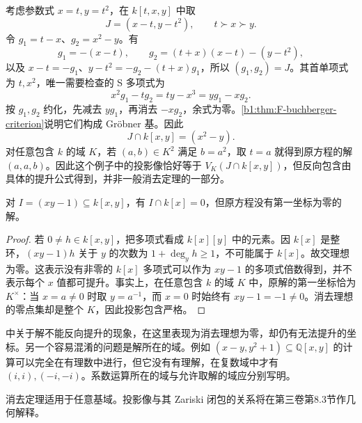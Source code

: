 \begin{example}[参数的消去]\label{b1:exm:F-parameter-elimination}
	考虑参数式 \(x=t,y=t^2\)，在 \(k[t,x,y]\) 中取
	\[
		J=(x-t,y-t^2),\qquad t\succ x\succ y.
	\]
	令 \(g_1=t-x\)、\(g_2=x^2-y\)。有
	\[
		g_1=-(x-t),\qquad g_2=(t+x)(x-t)-(y-t^2),
	\]
	以及 \(x-t=-g_1\)、\(y-t^2=-g_2-(t+x)g_1\)，所以 \((g_1,g_2)=J\)。其首单项式为 \(t,x^2\)，唯一需要检查的 S 多项式为
	\[
		x^2g_1-tg_2=ty-x^3=yg_1-xg_2.
	\]
	按 \(g_1,g_2\) 约化，先减去 \(yg_1\)，再消去 \(-xg_2\)，余式为零。\cref{b1:thm:F-buchberger-criterion}说明它们构成 Gröbner 基。因此
	\[
		J\cap k[x,y]=(x^2-y).
	\]
	对任意包含 \(k\) 的域 \(K\)，若 \((a,b)\in K^2\) 满足 \(b=a^2\)，取 \(t=a\) 就得到原方程的解 \((a,a,b)\)。因此这个例子中的投影像恰好等于 \(V_K(J\cap k[x,y])\)，但反向包含由具体的提升公式得到，并非一般消去定理的一部分。
\end{example}

\begin{example}[不能提升的点]\label{b1:exm:F-projection-nonlifting}
	对 \(I=(xy-1)\subseteq k[x,y]\)，有 \(I\cap k[x]=0\)，但原方程没有第一坐标为零的解。
\end{example}
\begin{proof}
	若 \(0\ne h\in k[x,y]\)，把多项式看成 \(k[x][y]\) 中的元素。因 \(k[x]\) 是整环，\((xy-1)h\) 关于 \(y\) 的次数为 \(1+\deg_yh\ge1\)，不可能属于 \(k[x]\)。故交理想为零。这表示没有非零的 \(k[x]\) 多项式可以作为 \(xy-1\) 的多项式倍数得到，并不表示每个 \(x\) 值都可提升。事实上，在任意包含 \(k\) 的域 \(K\) 中，原解的第一坐标恰为 \(K^\times\)：当 \(x=a\ne0\) 时取 \(y=a^{-1}\)，而 \(x=0\) 时始终有 \(xy-1=-1\ne0\)。消去理想的零点集却是整个 \(K\)，因此投影包含严格。
\end{proof}

中关于解不能反向提升的现象，在这里表现为消去理想为零，却仍有无法提升的坐标。另一个容易混淆的问题是解所在的域。例如 \((x-y,y^2+1)\subseteq\mathbb Q[x,y]\) 的计算可以完全在有理数中进行，但它没有有理解，在复数域中才有 \((i,i),(-i,-i)\)。系数运算所在的域与允许取解的域应分别写明。

\ProseParagraphBreak
消去定理适用于任意基域。投影像与其 Zariski 闭包的关系将在第三卷第8.3节作几何解释。
